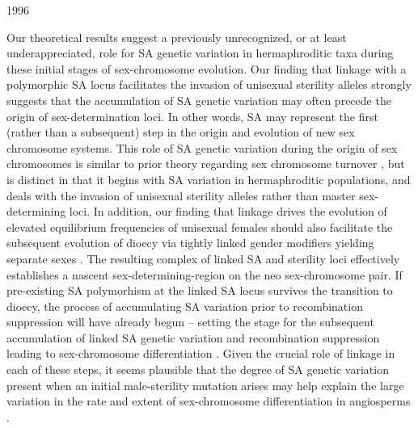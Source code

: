 1996\documentclass[9pt,twocolumn,twoside,lineno]{gsajnl}
\begin{document}
Our theoretical results suggest a previously unrecognized, or at least underappreciated, role for SA genetic variation in hermaphroditic taxa during these initial stages of sex-chromosome evolution. Our finding that linkage with a polymorphic SA locus facilitates the invasion of unisexual sterility alleles strongly suggests that the accumulation of SA genetic variation may often precede the origin of sex-determination loci. In other words, SA may represent the first (rather than a subsequent) step in the origin and evolution of new sex chromosome systems. This role of SA genetic variation during the origin of sex chromosomes is similar to prior theory regarding sex chromosome turnover \citep{vanDoornKirkpatrick2007,vanDoornKirkpatrick2010}, but is distinct in that it begins with SA variation in hermaphroditic populations, and deals with the invasion of unisexual sterility alleles rather than master sex-determining loci. In addition, our finding that linkage drives the evolution of elevated equilibrium frequencies of unisexual females should also facilitate the subsequent evolution of dioecy via tightly linked gender modifiers yielding separate sexes \citep{Charlesworth1978a}. The resulting complex of linked SA and sterility loci effectively establishes a nascent sex-determining-region on the neo sex-chromosome pair. If pre-existing SA polymorhism at the linked SA locus survives the transition to dioecy, the process of accumulating SA variation prior to recombination suppression will have already begun -- setting the stage for the subsequent accumulation of linked SA genetic variation and recombination suppression leading to sex-chromosome differentiation \citep{Charlesworth1978a,Rice1987,Bachtrog2006,Qiuetal2013}. Given the crucial role of linkage in each of these steps, it seems plausible that the degree of SA genetic variation present when an initial male-sterility mutation arises may help explain the large variation in the rate and extent of sex-chromosome differentiation in angiosperms \citep{Charlesworth2002,Renner2014,Bachtrog2014}.



\end{document}
